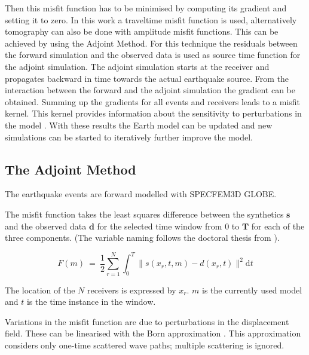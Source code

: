 
Then this misfit function has to be minimised by computing its gradient and setting it to zero. 
In this work a traveltime misfit function is used, alternatively tomography can also be done with amplitude misfit functions.
This can be achieved by using the Adjoint Method. For this technique the residuals between the forward simulation and the observed 
data is used as source time function %
for the adjoint simulation. 
The adjoint simulation starts at the receiver and propagates backward in time towards the actual earthquake source.
From the interaction between the forward and the adjoint simulation the gradient can be obtained. 
Summing up the gradients for all events and receivers leads to a misfit kernel. 
This kernel provides information about the sensitivity to perturbations in the model \citep{Magnoni2012}.
With these results the Earth model can be updated and new simulations can be started to iteratively further improve the model.


\subsection{The Adjoint Method}

The earthquake events are forward modelled with SPECFEM3D GLOBE. 


The misfit function takes the least squares difference between the synthetics $\boldsymbol{s}$ and the 
observed data $\boldsymbol{d}$ for the selected time window from $0$ to $\boldsymbol{T}$ for each of the three components. 
(The variable naming follows the doctoral thesis from \citealp{Magnoni2012}).

\begin{equation}
F(m) \ = \ \frac{1}{2} \sum_{r=1}^N \int_0^T \lVert  s(x_r, t, m) - d(x_r, t)  \lVert^2  \mathrm{d}t
\end{equation}

The location of the $N$ receivers is expressed by $x_r$. $m$ is the currently used model and $t$ is the time instance in the window.



Variations in the misfit function are due to perturbations in the displacement field. 
These can be linearised with the Born approximation \citep{Liu2012}.
This approximation %
considers only one-time scattered wave paths; multiple scattering is ignored.

